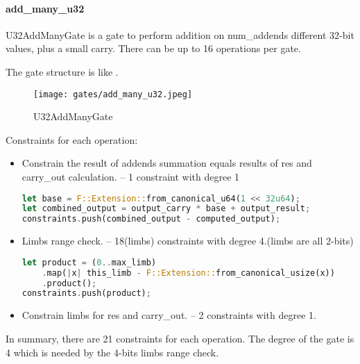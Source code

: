 \paragraph{add\_many\_u32}

U32AddManyGate is a gate to perform addition on num\_addends different 32-bit values, plus a small carry. 
There can be up to 16 operations per gate.

The gate structure is like .

\begin{figure}[!ht]
    \centering
    \texttt{[image: gates/add\_many\_u32.jpeg]}
    \caption{U32AddManyGate}
    \label{fig:add-many-u32}
\end{figure}

Constraints for each operation:
\begin{itemize}
    \item Constrain the result of addends summation equals results of res and carry\_out calculation. -- 1 constraint with degree 1
    \begin{lstlisting}[language=rust]
let base = F::Extension::from_canonical_u64(1 << 32u64);
let combined_output = output_carry * base + output_result;
constraints.push(combined_output - computed_output);
    \end{lstlisting}
    \item Limbs range check. -- 18(limbs) constraints with degree 4.(limbs are all 2-bits)
    \begin{lstlisting}[language=rust]
let product = (0..max_limb)
    .map(|x| this_limb - F::Extension::from_canonical_usize(x))
    .product();
constraints.push(product);
    \end{lstlisting}
    \item Constrain limbs for res and carry\_out. -- 2 constraints with degree 1.
\end{itemize}

In summary, there are 21 constraints for each operation. The degree of the gate is 4 which is needed by the 4-bits limbs range check.
